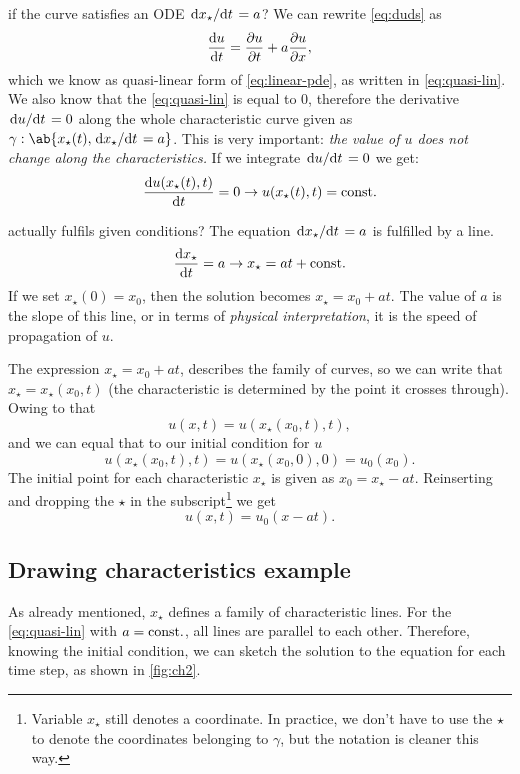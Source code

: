 \documentclass[justified, nobib, a4page]{tufte-handout}
\begin{document}
 if the curve satisfies an ODE
\(\odv{x_\star}/{t} = a\)? We can rewrite \cref{eq:duds} as
\[
	\odv{u}{t} =  \pdv{u}{t} + a\pdv{u}{x},
\]
which we know as quasi-linear form of \cref{eq:linear-pde}, as written in
\cref{eq:quasi-lin}. We also know that the \cref{eq:quasi-lin} is equal to 0,
therefore the derivative \(\odv{u}/{t} = 0\) along the whole characteristic
curve given as \(\gamma : \ab\{x_\star(t), \odv{x_\star}/{t} = a \}\). This is
very important: \emph{the value of \(u\) does not change along the
	characteristics.} If we integrate \(\odv{u}/{t} = 0\) we get:
\[
	\odv{u(x_\star(t), t)}{t} = 0 \rightarrow u(x_\star(t), t) = \const
\]

 actually fulfils given conditions?
The equation \(\odv{x_\star}/{t} = a\) is fulfilled by a line.
\[
	\odv{x_\star}{t} = a\rightarrow x_\star = at + \const
\]
If we set \(x_\star(0) = x_0\), then the solution becomes
\(x_\star = x_0 + at\). The value of \(a\) is the slope of this line, or in
terms of \emph{physical interpretation}, it is the speed of propagation of
\(u\).

The expression \(x_\star = x_0 + at\), describes the family of curves, so we
can write that \(x_\star = x_\star(x_0, t)\) (the characteristic is determined
by the point it crosses through). Owing to that
\[
	u(x, t) = u(x_\star(x_0, t), t),
\]
and we can equal that to our initial condition for \(u\)
\[
	u(x_\star(x_0, t), t) = u(x_\star(x_0, 0), 0) = u_0(x_0).
\]
The initial point for each characteristic \(x_\star\) is given as \(x_0 =
x_\star - at\). Reinserting and dropping the \(\star\) in the
subscript\footnote{%
	Variable \(x_\star\) still denotes a coordinate. In practice, we don't have
	to use the \(\star\) to denote the coordinates belonging to \(\gamma\), but
	the notation is cleaner this way.}
we get
\[
	u(x, t) = u_0(x - at).
\]
\subsection{Drawing characteristics example}

As already mentioned, \(x_\star\) defines a family of characteristic lines. For
the \cref{eq:quasi-lin} with \(a=\mathrm{const.}\), all lines are parallel to each
other. Therefore, knowing the initial condition, we can sketch the solution to
the equation for each time step, as shown in \cref{fig:ch2}.
\end{document}
